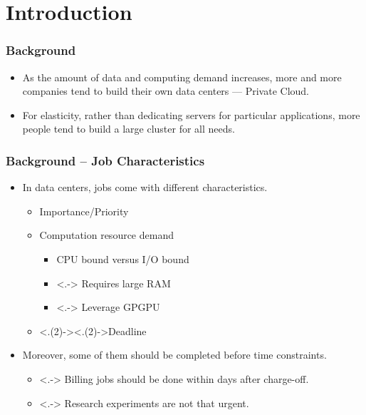 \section{Introduction}

\begin{frame}
  \frametitle{Background}
  \begin{itemize}[<+->]
    \item As the amount of data and computing demand increases, more and
      more companies tend to build their own data centers --- Private
      Cloud.
    \item For elasticity, rather than dedicating servers for particular
      applications, more people tend to build a large cluster for all
      needs.
  \end{itemize}
\end{frame}
\begin{frame}
  \frametitle{Background -- Job Characteristics}
  \begin{itemize}[<+->]
    \item In data centers, jobs come with different characteristics.
      \begin{itemize}
        \item Importance/Priority
        \item Computation resource demand
          \begin{itemize}
            \item CPU bound versus I/O bound
            \item <.-> Requires large RAM
            \item <.-> Leverage GPGPU
          \end{itemize}
        \item <.(2)->{\alert<.(2)->{Deadline}}
      \end{itemize}
    \item Moreover, some of them should be completed before time
      constraints.
      \begin{itemize}
        \item <.-> Billing jobs should be done within days after
          charge-off.
        \item <.-> Research experiments are not that urgent.
      \end{itemize}
  \end{itemize}
\end{frame}
